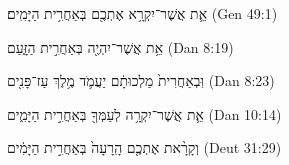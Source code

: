 
\begin{exe}

\ex\label{Blast_sim_exs1}
\texthebrew{
אֵ֛ת אֲשֶׁר־יִקְרָ֥א אֶתְכֶ֖ם בְּאַחֲרִ֥ית הַיָּמִֽים׃ 
} (Gen 49:1)

\ex\label{Blast_sim_exs2}
\texthebrew{
אֵ֥ת אֲשֶׁר־יִהְיֶ֖ה בְּאַחֲרִ֣ית הַזָּ֑עַם 
} (Dan 8:19)

\ex\label{Blast_sim_exs3}
\texthebrew{
וּֽבְאַחֲרִית֙ מַלְכוּתָ֔ם יַעֲמֹ֛ד מֶ֥לֶךְ עַז־פָּנִ֖ים 
} (Dan 8:23)

\ex\label{Blast_sim_exs4}
\texthebrew{
אֵ֛ת אֲשֶׁר־יִקְרָ֥ה לְעַמְּךָ֖ בְּאַחֲרִ֣ית הַיָּמִ֑ים 
} (Dan 10:14)

\ex\label{Blast_sim_exs5}
\texthebrew{
וְקָרָ֨את אֶתְכֶ֤ם הָֽרָעָה֙ בְּאַחֲרִ֣ית הַיָּמִ֔ים 
} (Deut 31:29)

\end{exe}
